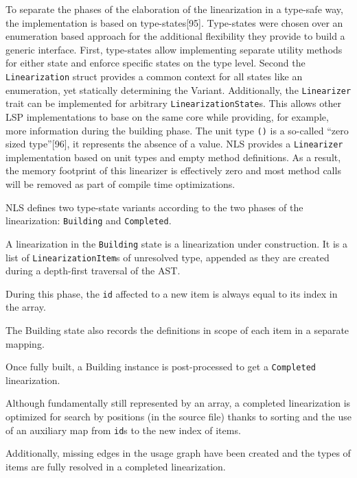 \documentclass[
  a4paper,
  bibtex,
  english,
  nomenclature]{kthlatex/kththesis/kththesis}
\providecommand{\tightlist}{%
  \setlength{\itemsep}{0pt}\setlength{\parskip}{0pt}}
\begin{document}
To separate the phases of the elaboration of the linearization in a
type-safe way, the implementation is based on type-states{[}95{]}.
Type-states were chosen over an enumeration based approach for the
additional flexibility they provide to build a generic interface. First,
type-states allow implementing separate utility methods for either state
and enforce specific states on the type level. Second the
\texttt{Linearization} struct provides a common context for all states
like an enumeration, yet statically determining the Variant.
Additionally, the \texttt{Linearizer} trait can be implemented for
arbitrary \texttt{LinearizationState}s. This allows other LSP
implementations to base on the same core while providing, for example,
more information during the building phase. The unit type \texttt{()} is
a so-called ``zero sized type''{[}96{]}, it represents the absence of a
value. NLS provides a \texttt{Linearizer} implementation based on unit
types and empty method definitions. As a result, the memory footprint of
this linearizer is effectively zero and most method calls will be
removed as part of compile time optimizations.

NLS defines two type-state variants according to the two phases of the
linearization: \texttt{Building} and \texttt{Completed}.

\begin{description}
\tightlist
\item[Building phase:]
A linearization in the \texttt{Building} state is a linearization under
construction. It is a list of \texttt{LinearizationItem}s of unresolved
type, appended as they are created during a depth-first traversal of the
AST.

During this phase, the \texttt{id} affected to a new item is always
equal to its index in the array.

The Building state also records the definitions in scope of each item in
a separate mapping.
\item[Post-Processing phase:]
Once fully built, a Building instance is post-processed to get a
\texttt{Completed} linearization.

Although fundamentally still represented by an array, a completed
linearization is optimized for search by positions (in the source file)
thanks to sorting and the use of an auxiliary map from \texttt{id}s to
the new index of items.

Additionally, missing edges in the usage graph have been created and the
types of items are fully resolved in a completed linearization.
\end{description}
\end{document}
